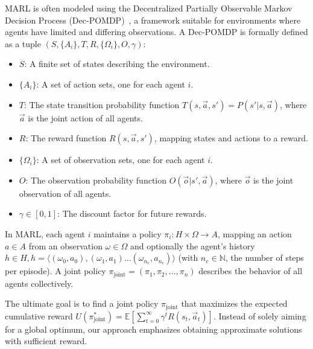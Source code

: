 \documentclass[a4paper,twoside]{article}
\begin{document}
MARL is often modeled using the Decentralized Partially Observable Markov Decision Process (Dec-POMDP)~\cite{Beynier2013}, a framework suitable for environments where agents have limited and differing observations. A Dec-POMDP is formally defined as a tuple $(S, \{A_i\}, T, R, \{\Omega_i\}, O, \gamma)$:

\begin{itemize}
    \item $S$: A finite set of states describing the environment.
    \item $\{A_i\}$: A set of action sets, one for each agent $i$.
    \item $T$: The state transition probability function $T(s, \vec{a}, s') = P(s'|s, \vec{a})$, where $\vec{a}$ is the joint action of all agents.
    \item $R$: The reward function $R(s, \vec{a}, s')$, mapping states and actions to a reward.
    \item $\{\Omega_i\}$: A set of observation sets, one for each agent $i$.
    \item $O$: The observation probability function $O(\vec{o} | s', \vec{a})$, where $\vec{o}$ is the joint observation of all agents.
    \item $\gamma \in [0,1]$: The discount factor for future rewards.
\end{itemize}

In MARL, each agent $i$ maintains a policy $\pi_i: H \times \Omega \rightarrow A$, mapping an action $a \in A$ from an observation $\omega \in \Omega$ and optionally the agent's history $h \in H, h=\langle(\omega_0,a_0),(\omega_1,a_1)\dots(\omega_{n_e},a_{n_e})\rangle$ (with $n_e \in \mathbb{N}$, the number of steps per episode). A joint policy $\pi_{\text{joint}} = (\pi_1, \pi_2, \ldots, \pi_n)$ describes the behavior of all agents collectively.

The ultimate goal is to find a joint policy $\pi_{\text{joint}}$ that maximizes the expected cumulative reward $U(\pi^*_{\text{joint}}) = \mathbb{E}\left[\sum_{t=0}^{\infty} \gamma^t R(s_t, \vec{a}_t)\right]$. Instead of solely aiming for a global optimum, our approach emphasizes obtaining approximate solutions with sufficient reward.
\end{document}
